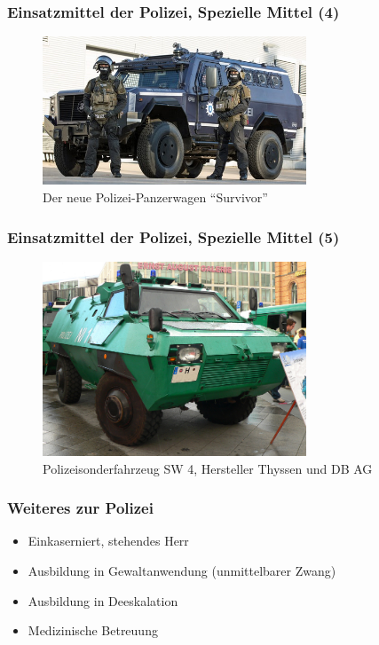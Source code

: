 \documentclass[]{beamer}
\begin{document}
	\begin{frame}
	\frametitle{Einsatzmittel der Polizei, Spezielle Mittel (4)}
	\begin{figure}[h!]
		\renewcommand{\figurename}{Foto} 
		\includegraphics[width=0.7\textwidth]{images/spezielle-mittel-polizeiausruestung1.jpg}
		\caption{Der neue Polizei-Panzerwagen \enquote{Survivor}}
	\end{figure}
	\end{frame}

	\begin{frame}
	\frametitle{Einsatzmittel der Polizei, Spezielle Mittel (5)}
	\begin{figure}[h!]
		\renewcommand{\figurename}{Foto} 
		\includegraphics[width=0.7\textwidth]{images/spezielle-mittel-polizeifahrzeuge2.jpg}
		\caption{Polizeisonderfahrzeug SW 4, Hersteller Thyssen und DB AG}
	\end{figure}
	\end{frame}

	\begin{frame}
	\frametitle{Weiteres zur Polizei}
	\begin{itemize}
		\item Einkaserniert, stehendes Herr
		\item Ausbildung in Gewaltanwendung (unmittelbarer Zwang)
		\item Ausbildung in Deeskalation
		\item Medizinische Betreuung
	\end{itemize}
	\end{frame}
\end{document}
